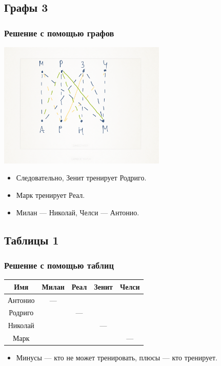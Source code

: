 \documentclass[compress,red]{beamer}
\begin{document}
\subsection{Графы 3}
\begin{frame}[fragile]
  \frametitle{Решение с помощью графов}
  \centerline{\includegraphics[width=0.6\textwidth]{images/graph-03.png}}
  \begin{itemize}
    \item Следовательно, Зенит тренирует Родриго.
    \item Марк тренирует Реал.
    \item Милан --- Николай, Челси --- Антонио.
  \end{itemize}
\end{frame}

\subsection{Таблицы 1}
\begin{frame}[fragile]
  \frametitle{Решение с помощью таблиц}
  
  \center
  {
  \begin{tabular}{|c|c|c|c|c|}
    \hline
    Имя & Милан & Реал  & Зенит & Челси \\
    \hline
    Антонио & --- &   & & \\
    \hline
    Родриго &  & ---  &  & \\
    \hline
    Николай &  &   & ---  & \\ 
    \hline
    Марк &  &   &  & --- \\
    \hline
  \end{tabular}
  }
  \begin{itemize}
    \item Минусы --- кто не может тренировать, плюсы --- кто тренирует.
  \end{itemize}
\end{frame}
\end{document}
